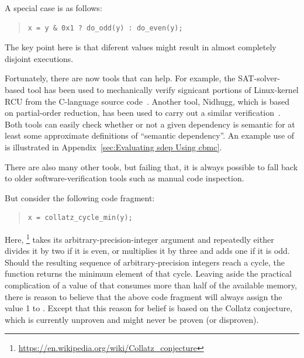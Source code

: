 \documentclass[10]{article}
\begin{document}
A special case is as follows:

\begin{quote}
\begin{verbatim}
x = y & 0x1 ? do_odd(y) : do_even(y);
\end{verbatim}
\end{quote}

The key point here is that diferent values might result in almost
completely disjoint executions.

Fortunately, there are now tools that can help.
For example, the SAT-solver-based  tool
has been used to mechanically verify signicant portions of Linux-kernel
RCU from the C-language source
code~\cite{LihaoLiang2016VerifyTreeRCU,LanceRoy2017CBMC-SRCU}.
Another tool, Nidhugg, which is based on partial-order
reduction, has been used to carry out a similar
verification~\cite{MichalisKokologiannakis2017NidhuggRCU,SMC-TreeRCU,MichalisKokologiannakis2019RCUstatelessModelCheck}.
Both tools can easily check whether or not a given dependency is semantic
for at least some approximate definitions of ``semantic dependency''.
An example use of  is illustrated in
Appendix~\ref{sec:Evaluating sdep Using cbmc}.

There are also many other tools, but failing that, it is always possible
to fall back to older software-verification tools such as manual
code inspection.

But consider the following code fragment:

\begin{quote}
\begin{verbatim}
x = collatz_cycle_min(y);
\end{verbatim}
\end{quote}

Here, \footnote{
	\url{https://en.wikipedia.org/wiki/Collatz_conjecture}}
takes its arbitrary-precision-integer argument and repeatedly either
divides it by two if it is even, or multiplies it by three and adds one
if it is odd.
Should the resulting sequence of arbitrary-precision integers reach
a cycle, the function returns the minimum element of that cycle.
Leaving aside the practical complication of a value of  that
consumes more than half of the available memory, there is reason to
believe that the above code fragment will always assign the value 1 to
.
Except that this reason for belief is based on the Collatz conjecture,
which is currently unproven and might never be proven (or disproven).
\end{document}
